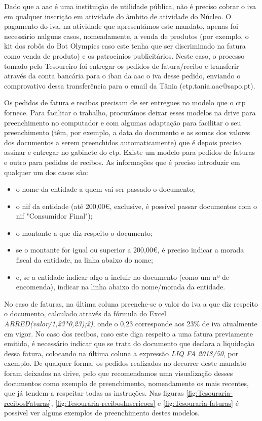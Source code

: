 Dado que a \acrshort{aac} é uma instituição de utilidade pública, não é preciso cobrar o \acrshort{iva} em qualquer inscrição em atividade do âmbito de atividade do Núcleo. O pagamento do \acrshort{iva}, na atividade que apresentámos este mandato, apenas foi necessário nalguns casos, nomeadamente, a venda de produtos (por exemplo, o kit dos robôs do Bot Olympics caso este tenha que ser discriminado na fatura como venda de produto) e os patrocínios publicitários. Neste caso, o processo tomado pelo Tesoureiro foi entregar os pedidos de fatura/recibo e transferir através da conta bancária para o \acrshort{iban} da \acrshort{aac} o \acrshort{iva} desse pedido, enviando o comprovativo dessa transferência para o email da Tânia (ctp.tania.aac@sapo.pt).

Os pedidos de fatura e recibos precisam de ser entregues no modelo que o \acrshort{ctp} fornece. Para facilitar o trabalho, procurámos deixar esses modelos na drive para preenchimento no computador e com algumas adaptação para facilitar o seu preenchimento (têm, por exemplo, a data do documento e as somas dos valores dos documentos a serem preenchidos automaticamente) que é depois preciso assinar e entregar no gabinete do \acrshort{ctp}. Existe um modelo para pedidos de faturas e outro para pedidos de recibos. As informações que é preciso introduzir em qualquer um dos casos são:
\begin{itemize}
    \item o nome da entidade a quem vai ser passado o documento;
    \item o \acrshort{nif} da entidade (até 200,00€, exclusive, é possível passar documentos com o \acrshort{nif} "Consumidor Final");
    \item o montante a que diz respeito o documento;
    \item se o montante for igual ou superior a 200,00€, é preciso indicar a morada fiscal da entidade, na linha abaixo do nome;
    \item e, se a entidade indicar algo a incluir no documento (como um nº de encomenda), indicar na linha abaixo do nome/morada da entidade.
\end{itemize}

No caso de faturas, na última coluna preenche-se o valor do \acrshort{iva} a que diz respeito o documento, calculado através da fórmula do Excel \textit{ARRED(valor/1,23*0,23);2)}, onde o 0,23 corresponde aos 23\% de \acrshort{iva} atualmente em vigor. No caso dos recibos, caso este diga respeito a uma fatura previamente emitida, é necessário indicar que se trata do documento que declara a liquidação dessa fatura, colocando na última coluna a expressão \textit{LIQ FA 2018/50}, por exemplo. De qualquer forma, os pedidos realizados no decorrer deste mandato foram deixados na drive, pelo que recomendamos uma visualização desses documentos como exemplo de preenchimento, nomeadamente os mais recentes, que já tendem a respeitar todas as instruções. Nas figuras \ref{fig:Tesouraria-recibosFaturas}, \ref{fig:Tesouraria-recibosInscricoes} e \ref{fig:Tesouraria-faturas} é possível ver alguns exemplos de preenchimento destes modelos.

